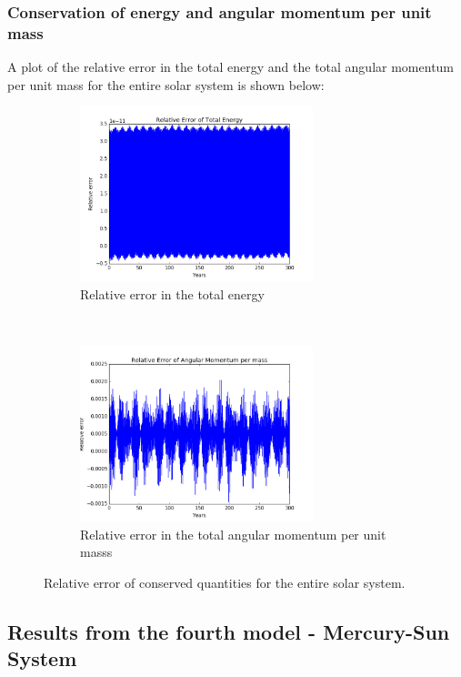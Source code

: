 \documentclass[a4paper, 10pt]{article}
\begin{document}
\subsubsection{Conservation of energy and angular momentum per unit mass}
A plot of the relative error in the total energy and the total angular momentum per unit mass for the entire solar system is shown below:
\begin{figure}[t!]
    \centering
    \begin{subfigure}[t]{0.5\textwidth}
        \centering
        \includegraphics[height=2.0in]{relErrEnFull.png}
        \caption{Relative error in the total energy}
    \end{subfigure}%
    ~ 
    \begin{subfigure}[t]{0.5\textwidth}
        \centering
        \includegraphics[height=2.0in]{relErrMomFull.png}
        \caption{Relative error in the total angular momentum per unit masss}
    \end{subfigure}
    \caption{Relative error of conserved quantities for the entire solar system.} \label{fig:error_full_solar_system}
\end{figure}

\subsection{Results from the fourth model - Mercury-Sun System}
\end{document}

